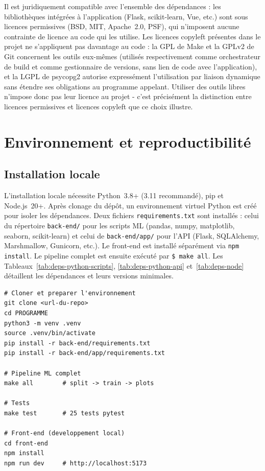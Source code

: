 \documentclass[12pt,a4paper,openany]{report}
\newcommand{\file}[1]{\texttt{#1}}
\newcommand{\cmd}[1]{\texttt{\$ #1}}
\begin{document}
Il est juridiquement compatible avec l'ensemble des dépendances : les bibliothèques intégrées à l'application (Flask, scikit-learn, Vue, etc.) sont sous licences permissives (BSD, MIT, Apache~2.0, PSF), qui n'imposent aucune contrainte de licence au code qui les utilise. Les licences copyleft présentes dans le projet ne s'appliquent pas davantage au code : la GPL de Make et la GPLv2 de Git concernent les outils eux-mêmes (utilisés respectivement comme orchestrateur de build et comme gestionnaire de versions, sans lien de code avec l'application), et la LGPL de psycopg2 autorise expressément l'utilisation par liaison dynamique sans étendre ses obligations au programme appelant. Utiliser des outils libres n'impose donc pas leur licence au projet - c'est précisément la distinction entre licences permissives et licences copyleft que ce choix illustre.


\chapter{Environnement et reproductibilité}

\section{Installation locale}

L'installation locale nécessite Python~3.8+ (3.11 recommandé), pip et Node.js~20+. Après clonage du dépôt, un environnement virtuel Python est créé pour isoler les dépendances. Deux fichiers \texttt{requirements.txt} sont installés : celui du répertoire \file{back-end/} pour les scripts ML (pandas, numpy, matplotlib, seaborn, scikit-learn) et celui de \file{back-end/app/} pour l'API (Flask, SQLAlchemy, Marshmallow, Gunicorn, etc.). Le front-end est installé séparément via \texttt{npm install}. Le pipeline complet est ensuite exécuté par \cmd{make all}. Les Tableaux~\ref{tab:deps-python-scripts}, \ref{tab:deps-python-api} et~\ref{tab:deps-node} détaillent les dépendances et leurs versions minimales.

\begin{lstlisting}[style=bash, caption={Installation et exécution du pipeline}]
# Cloner et preparer l'environnement
git clone <url-du-repo>
cd PROGRAMME
python3 -m venv .venv
source .venv/bin/activate
pip install -r back-end/requirements.txt
pip install -r back-end/app/requirements.txt

# Pipeline ML complet
make all        # split -> train -> plots

# Tests
make test       # 25 tests pytest

# Front-end (developpement local)
cd front-end
npm install
npm run dev     # http://localhost:5173
\end{lstlisting}
\end{document}
